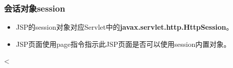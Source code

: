 \begin{frame}[fragile] %
\frametitle{会话对象session} 

\begin{itemize}
\item JSP的session对象对应Servlet中的{\bf\Blue javax.servlet.http.HttpSession}。
\item JSP页面使用page指令指示此JSP页面是否可以使用session内置对象。
\end{itemize}


\begin{jspCode}
  <%
\end{jspCode}

\end{frame}


